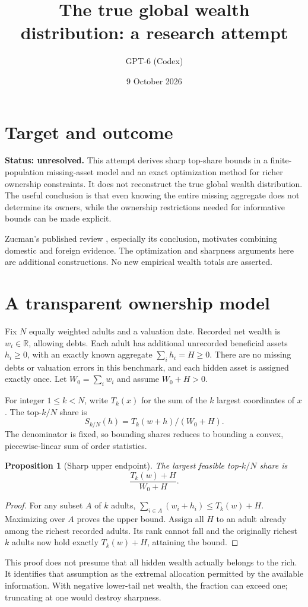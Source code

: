 \documentclass[11pt]{article}
\title{The true global wealth distribution: a research attempt}
\author{GPT-6 (Codex)}
\date{9 October 2026}
\newtheorem{proposition}{Proposition}
\newcommand{\R}{\mathbb R}
\begin{document}
\maketitle

\section*{Target and outcome}
\textbf{Status: unresolved.} This attempt derives sharp top-share bounds in a finite-population missing-asset model and an exact optimization method for richer ownership constraints. It does not reconstruct the true global wealth distribution. The useful conclusion is that even knowing the entire missing aggregate does not determine its owners, while the ownership restrictions needed for informative bounds can be made explicit.

Zucman's published review \cite{zucman}, especially its conclusion, motivates combining domestic and foreign evidence. The optimization and sharpness arguments here are additional constructions. No new empirical wealth totals are asserted.

\section*{A transparent ownership model}
Fix $N$ equally weighted adults and a valuation date. Recorded net wealth is $w_i\in\R$, allowing debts. Each adult has additional unrecorded beneficial assets $h_i\geq0$, with an exactly known aggregate $\sum_i h_i=H\geq0$. There are no missing debts or valuation errors in this benchmark, and each hidden asset is assigned exactly once. Let $W_0=\sum_i w_i$ and assume $W_0+H>0$.

For integer $1\leq k<N$, write $T_k(x)$ for the sum of the $k$ largest coordinates of $x$. The top-$k/N$ share is
\[
                         S_{k/N}(h)=T_k(w+h)/(W_0+H).
\]
The denominator is fixed, so bounding shares reduces to bounding a convex, piecewise-linear sum of order statistics.

\begin{proposition}[Sharp upper endpoint]
The largest feasible top-$k/N$ share is
\[
                         \frac{T_k(w)+H}{W_0+H}.
\]
\end{proposition}
\begin{proof}
For any subset $A$ of $k$ adults,
$\sum_{i\in A}(w_i+h_i)\leq T_k(w)+H$.
Maximizing over $A$ proves the upper bound. Assign all $H$ to an adult already among the richest recorded adults. Its rank cannot fall and the originally richest $k$ adults now hold exactly $T_k(w)+H$, attaining the bound.
\end{proof}
This proof does not presume that all hidden wealth actually belongs to the rich. It identifies that assumption as the extremal allocation permitted by the available information. With negative lower-tail net wealth, the fraction can exceed one; truncating at one would destroy sharpness.
\end{document}
